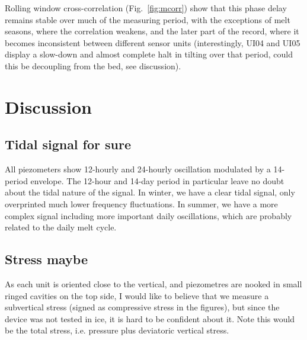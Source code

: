 \documentclass[utf8]{article}
\begin{document}
    Rolling window cross-correlation (Fig.~\ref{fig:mcorr}) show that this
    phase delay remains stable over much of the measuring period, with the
    exceptions of melt seasons, where the correlation weakens, and the later
    part of the record, where it becomes inconsistent between different sensor
    units (interestingly, UI04 and UI05 display a slow-down and almost complete
    halt in tilting over that period, could this be decoupling from the bed,
    see discussion).


\section{Discussion}

\subsection{Tidal signal for sure}

    All piezometers show 12-hourly and 24-hourly oscillation modulated by a
    14-period envelope. The 12-hour and 14-day period in particular leave no
    doubt about the tidal nature of the signal. In winter, we have a clear
    tidal signal, only overprinted much lower frequency fluctuations. In
    summer, we have a more complex signal including more important daily
    oscillations, which are probably related to the daily melt cycle.

\subsection{Stress maybe}

    As each unit is oriented close to the vertical, and piezometres are nooked
    in small ringed cavities on the top side, I would like to believe that we
    measure a subvertical stress (signed as compressive stress in the figures),
    but since the device was not tested in ice, it is hard to be confident
    about it. Note this would be the total stress, i.e. pressure plus
    deviatoric vertical stress.

\end{document}
